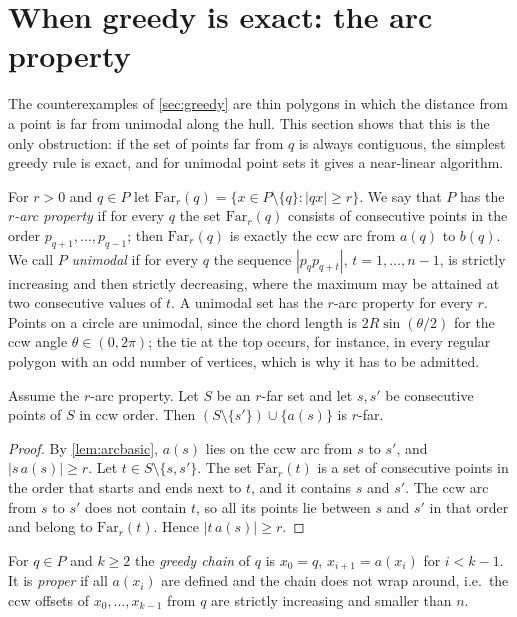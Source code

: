 \chapter{When greedy is exact: the arc property}\label{sec:arc}

The counterexamples of \cref{sec:greedy} are thin polygons in which the
distance from a point is far from unimodal along the hull. This section shows
that this is the only obstruction: if the set of points far from $q$ is always
contiguous, the simplest greedy rule is exact, and for unimodal point sets it
gives a near-linear algorithm.

For $r>0$ and $q\in P$ let $\mathrm{Far}_r(q)=\{x\in P\setminus\{q\}:|qx|\ge r\}$.
We say that $P$ has the \emph{$r$-arc property} if for every $q$ the set
$\mathrm{Far}_r(q)$ consists of consecutive points in the order
$p_{q+1},\dots,p_{q-1}$; then $\mathrm{Far}_r(q)$ is exactly the ccw arc from
$a(q)$ to $b(q)$. We call $P$ \emph{unimodal} if for every $q$ the sequence
$|p_qp_{q+t}|$, $t=1,\dots,n-1$, is strictly increasing and then strictly
decreasing, where the maximum may be attained at two consecutive values of
$t$. A unimodal set has the $r$-arc property for every $r$. Points on a circle
are unimodal, since the chord length is $2R\sin(\theta/2)$ for the ccw angle
$\theta\in(0,2\pi)$; the tie at the top occurs, for instance, in every regular
polygon with an odd number of vertices, which is why it has to be admitted.

\begin{lemma}[Exchange]\label{lem:a1}
Assume the $r$-arc property. Let $S$ be an $r$-far set and let $s,s'$ be
consecutive points of $S$ in ccw order. Then $(S\setminus\{s'\})\cup\{a(s)\}$
is $r$-far.
\end{lemma}
\begin{proof}
By \cref{lem:arcbasic}, $a(s)$ lies on the ccw arc from $s$ to $s'$, and
$|s\,a(s)|\ge r$. Let $t\in S\setminus\{s,s'\}$. The set $\mathrm{Far}_r(t)$
is a set of consecutive points in the order that starts and ends next to $t$,
and it contains $s$ and $s'$. The ccw arc from $s$ to $s'$ does not contain
$t$, so all its points lie between $s$ and $s'$ in that order and belong to
$\mathrm{Far}_r(t)$. Hence $|t\,a(s)|\ge r$.
\end{proof}

For $q\in P$ and $k\ge2$ the \emph{greedy chain} of $q$ is $x_0=q$,
$x_{i+1}=a(x_i)$ for $i<k-1$. It is \emph{proper} if all $a(x_i)$ are defined
and the chain does not wrap around, i.e.\ the ccw offsets of $x_0,\dots,x_{k-1}$
from $q$ are strictly increasing and smaller than $n$.

